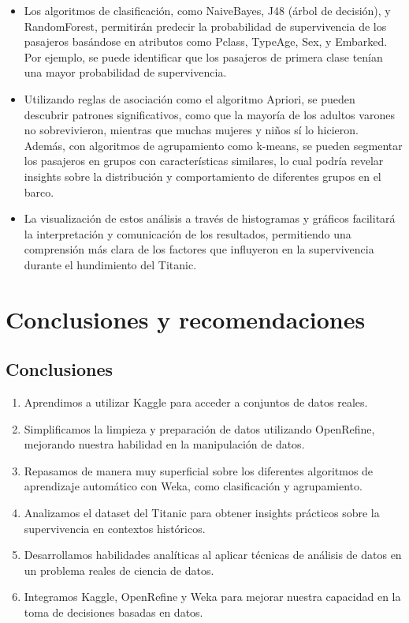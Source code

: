 \documentclass[12pt]{article}
\begin{document}
        \begin{itemize}
            \item Los algoritmos de clasificación, como NaiveBayes, J48 (árbol de decisión), y RandomForest, permitirán predecir la probabilidad de supervivencia de los pasajeros basándose en atributos como Pclass, TypeAge, Sex, y Embarked. Por ejemplo, se puede identificar que los pasajeros de primera clase tenían una mayor probabilidad de supervivencia. 
            \item Utilizando reglas de asociación como el algoritmo Apriori, se pueden descubrir patrones significativos, como que la mayoría de los adultos varones no sobrevivieron, mientras que muchas mujeres y niños sí lo hicieron. Además, con algoritmos de agrupamiento como k-means, se pueden segmentar los pasajeros en grupos con características similares, lo cual podría revelar insights sobre la distribución y comportamiento de diferentes grupos en el barco. 
            \item La visualización de estos análisis a través de histogramas y gráficos facilitará la interpretación y comunicación de los resultados, permitiendo una comprensión más clara de los factores que influyeron en la supervivencia durante el hundimiento del Titanic.
        \end{itemize}

    \newpage
    \section{Conclusiones y recomendaciones}
        \subsection{Conclusiones}
            \begin{enumerate}
                \item Aprendimos a utilizar Kaggle para acceder a conjuntos de datos reales. 
                \item Simplificamos la limpieza y preparación de datos utilizando OpenRefine, mejorando nuestra habilidad en la manipulación de datos.
                \item Repasamos de manera muy superficial sobre los diferentes algoritmos de aprendizaje automático con Weka, como clasificación y agrupamiento.
                \item Analizamos el dataset del Titanic para obtener insights prácticos sobre la supervivencia en contextos históricos.
                \item Desarrollamos habilidades analíticas al aplicar técnicas de análisis de datos en un problema reales de ciencia de datos.
                \item Integramos Kaggle, OpenRefine y Weka para mejorar nuestra capacidad en la toma de decisiones basadas en datos.
            \end{enumerate}
\end{document}
